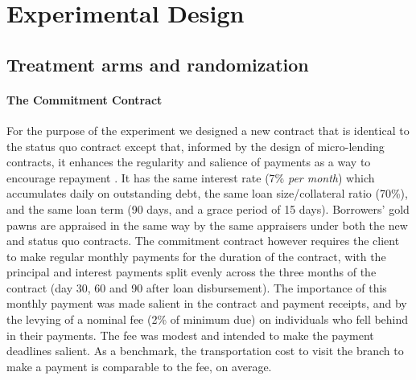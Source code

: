 \documentclass[12pt, a4paper]{article}
\begin{document}
\section{Experimental Design} \label{Design}

\subsection{Treatment arms and randomization}

\paragraph*{The Commitment Contract} For the purpose of the experiment we designed a new contract that is identical to the status quo contract except that, informed by the design of micro-lending contracts, it enhances the regularity and salience of payments as a way to encourage repayment \citep{morduch1999microfinance, bauer2012behavioral}.  It has the same interest rate (7\% \textit{per month}) which accumulates daily on outstanding debt, the same loan size/collateral ratio (70\%), and the same loan term (90 days, and a grace period of 15 days). Borrowers' gold pawns are appraised in the same way by the same appraisers under both the new and status quo contracts. The commitment contract however requires the client to make regular monthly payments for the duration of the contract, with the principal and interest payments split evenly across the three months of the contract (day 30, 60 and 90 after loan disbursement). The importance of this monthly payment was made salient in the contract and payment receipts, and by the levying of a nominal fee (2\% of minimum due) on individuals who fell behind in their payments. %
The fee was modest and intended to make the payment deadlines salient. As a benchmark, the transportation cost to visit the branch to make a payment is comparable to the fee, on average.
\end{document}

